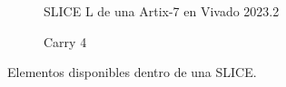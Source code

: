 \begin{figure}[H]
     \centering
     \begin{subfigure}{0.45\textwidth}
           \centering
           \caption{SLICE L de una Artix-7 en Vivado 2023.2}
     \end{subfigure}%
     \hspace{10pt}%
     \begin{subfigure}{0.4\textwidth}
           \centering
           \caption{Carry 4}
     \end{subfigure}
     \caption{Elementos disponibles dentro de una SLICE.}
     \label{SliceYCarry}
\end{figure}%

